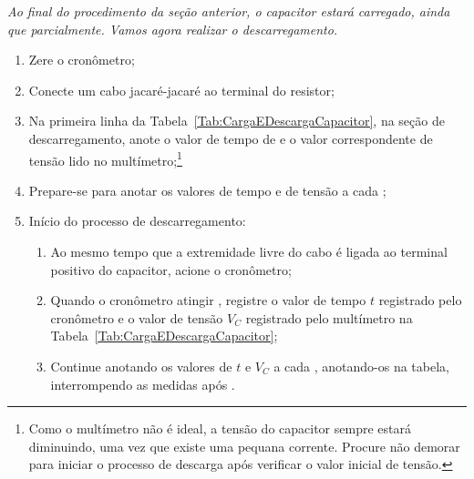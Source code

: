 {\it
Ao final do procedimento da seção anterior, o capacitor estará carregado, ainda que parcialmente. Vamos agora realizar o descarregamento.
}
\begin{enumerate}
	\item Zere o cronômetro;
	\item Conecte um cabo jacaré-jacaré ao terminal do resistor;
	\item Na primeira linha da Tabela~\ref{Tab:CargaEDescargaCapacitor}, na seção de descarregamento, anote o valor de tempo de  e o valor correspondente de tensão lido no multímetro;\footnote{Como o multímetro não é ideal, a tensão do capacitor sempre estará diminuindo, uma vez que existe uma pequana corrente. Procure não demorar para iniciar o processo de descarga após verificar o valor inicial de tensão.}
	\item Prepare-se para anotar os valores de tempo e de tensão a cada ;
	\item Início do processo de descarregamento:
	\begin{enumerate}
	    \item Ao mesmo tempo que a extremidade livre do cabo é ligada ao terminal positivo do capacitor, acione o cronômetro;
	    \item Quando o cronômetro atingir , registre o valor de tempo $t$ registrado pelo cronômetro e o valor de tensão $V_C$ registrado pelo multímetro na Tabela~\ref{Tab:CargaEDescargaCapacitor};
        \item Continue anotando os valores de $t$ e $V_C$ a cada , anotando-os na tabela, interrompendo as medidas após .
    \end{enumerate}
\end{enumerate}

\cleardoublepage


\vspace{15mm}

